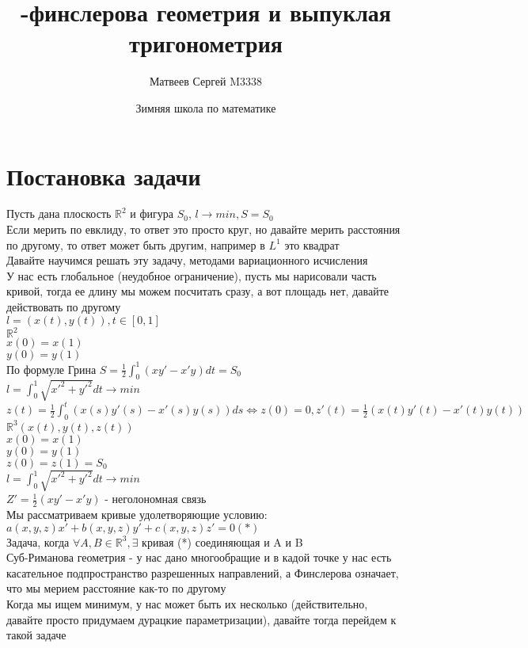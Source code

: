 \documentclass{article}
\title{\hugeСуб-финслерова геометрия и выпуклая тригонометрия}
\author{Матвеев Сергей M3338}
\date{Зимняя школа по математике}
\newcommand\0{\mathbb{0}}
\newcommand\1{\mathbb{1}}
\newcommand{\LRto}{\Leftrightarrow}
\begin{document}
\maketitle
\section{Постановка задачи}
Пусть дана плоскость $\mathbb{R}^2$ и фигура $S_0$, $l \to min, S = S_0$\\
Если мерить по евклиду, то ответ это просто круг, но давайте мерить расстояния по другому, то ответ может быть другим, например в $L^1$ это квадрат\\
Давайте научимся решать эту задачу, методами вариационного исчисления\\
У нас есть глобальное (неудобное ограничение), пусть мы нарисовали часть кривой, тогда ее длину мы можем посчитать сразу, а вот площадь нет, давайте действовать по другому\\
$l = (x(t), y(t)), t \in [0, 1]$\\
$\mathbb{R}^2$\\
$x(0) = x(1)$\\
$y(0) = y(1)$\\
По формуле Грина $S = \frac{1}{2}\displaystyle\int_0^1(xy' - x'y) dt = S_0$\\
$l = \displaystyle\int_0^1 \sqrt{x'^2 + y'^2} dt \to min$\\
$z(t) = \frac{1}{2}\displaystyle\int_0^t(x(s)y'(s) - x'(s)y(s)) ds \LRto z(0) = 0, z'(t) = \frac{1}{2}(x(t)y'(t) - x'(t)y(t))$\\
$\mathbb{R}^3 (x(t), y(t), z(t))$\\
$x(0) = x(1)$\\
$y(0) = y(1)$\\
$z(0) = z(1) = S_0$\\
$l = \displaystyle\int_0^1 \sqrt{x'^2 + y'^2}dt \to min$\\
$Z' = \frac{1}{2}(xy' - x'y)$ - неголономная связь\\
Мы рассматриваем кривые удолетворяющие условию: $a(x, y, z)x' + b(x, y, z)y' + c(x, y, z)z' = 0 (*)$\\
Задача, когда $\forall A, B \in \mathbb{R}^3, \exists$ кривая (*) соединяющая и A и B\\
Суб-Риманова геометрия - у нас дано многообращие и в кадой точке у нас есть касательное подпространство разрешенных направлений, а Финслерова означает, что мы мерием расстояние как-то по другому\\
Когда мы ищем минимум, у нас может быть их несколько (действительно, давайте просто придумаем дурацкие параметризации), давайте тогда перейдем к такой задаче\\
\end{document}
